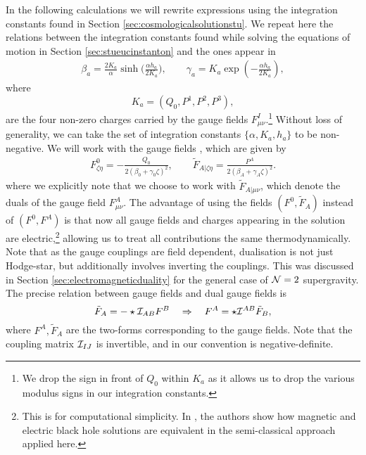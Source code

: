  In the following calculations we will rewrite expressions using the integration constants found in Section \ref{sec:cosmologicalsolutionstu}. We repeat here the relations between the integration constants found while solving the equations of motion in Section \ref{sec:stueucinstanton} and the ones appear in 
\begin{equation}
\label{eq:stuintconst}
    \begin{aligned}
        \beta_a = \frac{2 K_a}{\alpha} \sinh \bigg(\frac{\alpha h_a}{2 K_a}\bigg), \qquad
        \gamma_a = K_a \exp \left(-\frac{\alpha h_a}{2 K_a} \right),
    \end{aligned}
\end{equation}
where 
\[
K_a = \left(Q_0, P^1, P^2, P^3 \right),
\]
are the four non-zero charges carried by the gauge fields $F^I_{\mu \nu}$.\footnote{We drop the sign in front of $Q_0$ within $K_a$ as it allows us to drop the various modulus signs in our integration constants.} Without loss of generality, we can take the set of integration constants $\{\alpha, K_a, h_a \}$ to be non-negative. We will work with the gauge fields , which are given by
\begin{equation}
\label{eq:firstlawgaugefield}
    \begin{aligned}
        F^0_{\zeta \eta} =  -\frac{Q_0}{2(\beta_0 + \gamma_0 \zeta)^2}, \qquad \tilde{F}_{A |\zeta \eta} = \frac{P^A}{2(\beta_A + \gamma_A \zeta)^2}.
    \end{aligned}
\end{equation}
where we explicitly note that we choose to work with $\tilde{F}_{A|\mu \nu}$, which denote the duals of the gauge field $F^A_{\mu \nu}$. The advantage of using the fields $(F^0, \tilde{F}_A)$ instead of $(F^0, F^A)$ is that now all gauge fields and charges appearing in the solution are electric,\footnote{This is for computational simplicity. In \cite{Hawking:1995ap}, the authors show how magnetic and electric black hole solutions are equivalent in the semi-classical approach applied here.} allowing us to treat all contributions the same thermodynamically. Note that as the gauge couplings are field dependent, dualisation is not just Hodge-star, but additionally involves inverting the couplings. This was discussed in Section \ref{sec:electromagneticduality} for the general case of ${\cal N} = 2$ supergravity. The precise relation between gauge fields and dual gauge fields is
\begin{equation*}
    \tilde{F}_A = - \star {\cal I}_{AB} F^B \quad \Rightarrow \quad F^A = \star {\cal I}^{AB} \tilde{F}_B,
\end{equation*}
where $F^A, \tilde{F}_A$ are the two-forms corresponding to the gauge fields. Note that the coupling matrix ${\cal I}_{IJ}$ is invertible, and in our convention is negative-definite. 

